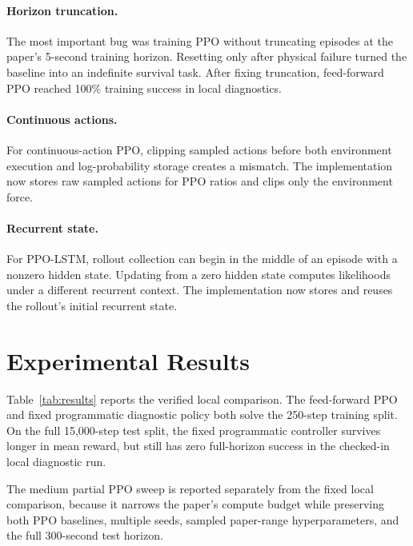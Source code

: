 \documentclass[letterpaper,twocolumn,10pt]{article}
\begin{document}
\paragraph{Horizon truncation.}
The most important bug was training PPO without truncating episodes at the
paper's 5-second training horizon.  Resetting only after physical failure
turned the baseline into an indefinite survival task.  After fixing truncation,
feed-forward PPO reached 100\% training success in local diagnostics.

\paragraph{Continuous actions.}
For continuous-action PPO, clipping sampled actions before both environment
execution and log-probability storage creates a mismatch.  The implementation
now stores raw sampled actions for PPO ratios and clips only the environment
force.

\paragraph{Recurrent state.}
For PPO-LSTM, rollout collection can begin in the middle of an episode with a
nonzero hidden state.  Updating from a zero hidden state computes likelihoods
under a different recurrent context.  The implementation now stores and reuses
the rollout's initial recurrent state.

\section{Experimental Results}

Table~\ref{tab:results} reports the verified local comparison.  The
feed-forward PPO and fixed programmatic diagnostic policy both solve the
250-step training split.  On the full 15,000-step test split, the fixed
programmatic controller survives longer in mean reward, but still has zero
full-horizon success in the checked-in local diagnostic run.

\begin{table}[t]
\centering
\caption{Local diagnostic evaluation generated from repository result
artifacts.  Test success uses the full
300-second horizon.}
\label{tab:results}

\end{table}

The medium partial PPO sweep is reported separately from the fixed local
comparison, because it narrows the paper's compute budget while preserving both
PPO baselines, multiple seeds, sampled paper-range hyperparameters, and the full
300-second test horizon.

\end{document}
